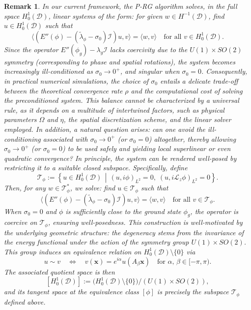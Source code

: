 \documentclass[preprint,3p]{elsarticle}
\newtheorem{remark}{Remark}[section]
\begin{document}
\begin{remark}\label{Re4.1}{
In our current framework, the P-RG algorithm solves, in the full space $H_0^1(\mathcal{D})$, linear systems of the form: for given $w \in H^{-1}(\mathcal{D})$, find $u \in H_0^1(\mathcal{D})$ such that
	\[
	\big\langle (E''(\phi) - (\widetilde{\lambda}_{\phi} - \sigma_0)\mathcal{I}) u, v \big\rangle = \langle w, v \rangle \quad \text{for all } v \in H_0^1(\mathcal{D}).
	\]
	Since the operator $E''(\phi_g) - \lambda_g \mathcal{I}$ lacks coercivity due to the $U(1) \times SO(2)$ symmetry (corresponding to phase and spatial rotations), the system becomes increasingly ill-conditioned as $\sigma_0 \to 0^+$, and singular when $\sigma_0 = 0$. Consequently, in practical numerical simulations, the choice of $\sigma_0$ entails a delicate trade-off between the theoretical convergence rate $\rho$ and the computational cost of solving the preconditioned system. This balance cannot be characterized by a universal rule, as it depends on a multitude of intertwined factors, such as physical parameters $\Omega$ and $\eta$, the spatial discretization scheme, and the linear solver employed.}
	{In addition,
		a natural question arises: can one avoid the ill-conditioning associated with $\sigma_0 \to 0^+$ (or $\sigma_0=0$) altogether, thereby allowing $\sigma_0 \to 0^+$ (or $\sigma_0=0$) to be used safely and yielding local superlinear or even quadratic convergence?
	In principle, the system can be rendered well-posed by restricting it to a suitable closed subspace. Specifically, define
	\[
	\mathcal{T}_\phi := \left\{ u \in H_0^1(\mathcal{D}) \,\middle|\, (u, i\phi)_{L^2} = 0,\; (u, i\mathcal{L}_z \phi)_{L^2} = 0 \right\}.
	\]
	Then, for any $w \in \mathcal{T}_\phi^*$, we solve: find $u \in \mathcal{T}_\phi$ such that
	\[
	\big\langle (E''(\phi) - (\widetilde{\lambda}_{\phi} - \sigma_0)\mathcal{I}) u, v \big\rangle = \langle w, v \rangle \quad \text{for all } v \in \mathcal{T}_\phi.
	\]
	When $\sigma_0 = 0$ and $\phi$ is sufficiently close to the ground state $\phi_g$, the operator is coercive on $\mathcal{T}_\phi$, ensuring well-posedness. This construction is well-motivated by the underlying geometric structure: the degeneracy stems from the invariance of the energy functional under the action of the symmetry group $ U(1) \times SO(2)$. This group induces an equivalence relation on $H_0^1(\mathcal{D}) \setminus \{0\}$ via
	\[
	u \sim v \quad \Longleftrightarrow \quad v(\bm{x}) = e^{i\alpha} u(A_\beta \bm{x}) \quad \text{for } \alpha,\,\beta \in [-\pi,\pi).
	\]
 	The associated quotient space is then
	\[
	[H_0^1(\mathcal{D})] := \big( H_0^1(\mathcal{D}) \setminus \{0\} \big) / (U(1) \times SO(2)),
	\]
	and its tangent space at the equivalence class $[\phi]$ is precisely the subspace $\mathcal{T}_\phi$ defined above.}
\end{remark}
\end{document}
